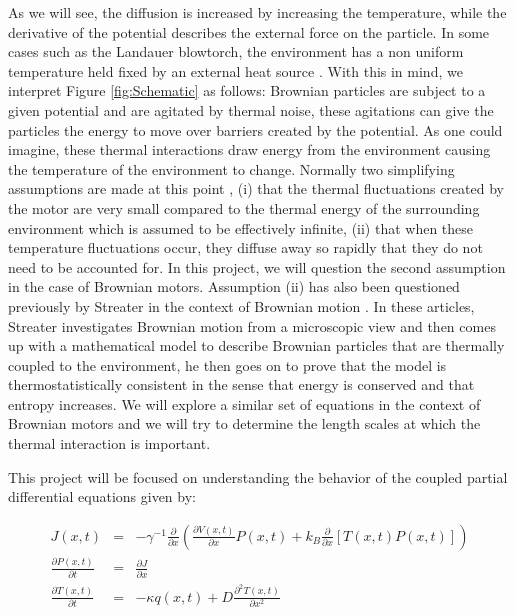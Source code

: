 As we will see, the diffusion is increased by increasing the temperature, while the derivative of the potential describes the external force on the particle. In some cases such as the Landauer blowtorch, the environment has a non uniform temperature held fixed by an external heat source \cite{Landauer1988}. With this in mind, we interpret Figure \ref{fig:Schematic} as follows: Brownian particles are subject to a given potential and are agitated by thermal noise, these agitations can give the particles the energy to move over barriers created by the potential. As one could imagine, these thermal interactions draw energy from the environment causing the temperature of the environment to change. Normally two simplifying assumptions are made at this point \cite{Reimann2001}, (i) that the thermal fluctuations created by the motor are very small compared to the thermal energy of the surrounding environment which is assumed to be effectively infinite, (ii) that when these temperature fluctuations occur, they diffuse away so rapidly that they do not need to be accounted for. In this project, we will question the second assumption in the case of Brownian motors. Assumption (ii) has also been questioned previously by Streater in the context of Brownian motion \cite{Streater1997, Streater1997a}. In these articles, Streater investigates Brownian motion from a microscopic view and then comes up with a mathematical model to describe Brownian particles that are thermally coupled to the environment, he then goes on to prove that the model is thermostatistically consistent in the sense that energy is conserved and that entropy increases. We will explore a similar set of equations in the context of Brownian motors and we will try to determine the length scales at which the thermal interaction is important.

This project will be focused on understanding the behavior of the coupled partial differential equations given by:

\begin{eqnarray}
J(x, t) &=& -\gamma^{-1} \frac{\partial}{\partial x} \left ( \frac{\partial V(x, t)}{\partial x} P(x, t) + k_B \frac{\partial}{\partial x} \left [T(x, t) P(x, t) \right] \right )  \\
\frac{\partial P(x, t)}{\partial t} &=& \frac{\partial J}{\partial x} \label{eqn:Smoluchowski} \\
\frac{\partial T(x, t)}{\partial t} &=& -\kappa q(x, t) + D \frac{\partial^2 T(x, t)}{\partial x^2} \label{eqn:TemperatureEvolution}
\end{eqnarray}

